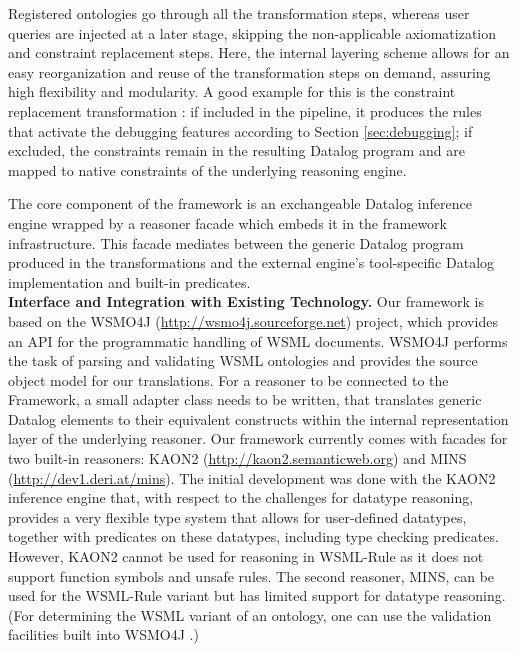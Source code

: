 Registered ontologies go through all the transformation steps,
whereas user queries are injected at a later stage, skipping the
non-applicable axiomatization and constraint replacement steps.
Here, the internal layering scheme allows for an easy
reorganization and reuse of the transformation steps on demand,
assuring high flexibility and modularity. A good example for this
is the constraint replacement transformation \transdebug: if
included in the pipeline, it produces the rules that activate the
debugging features according to Section \ref{sec:debugging}; if
excluded, the constraints remain in the resulting Datalog program
and are mapped to native constraints of the underlying reasoning
engine.

The core component of the framework is an exchangeable Datalog
inference engine wrapped by a reasoner facade which embeds it in the
framework infrastructure. This facade mediates between the generic
Datalog program produced in the transformations and the external
engine's tool-specific Datalog implementation and built-in
predicates.\\[2mm]
{\bfseries Interface and Integration with Existing Technology.} Our
framework is based on the WSMO4J
({\url{http://wsmo4j.sourceforge.net}}) project, which provides an
API for the programmatic handling of WSML documents. WSMO4J performs
the task of parsing and validating WSML ontologies and provides the
source object model for our translations. For a reasoner to be
connected to the Framework, a small adapter class needs to be
written, that translates generic Datalog elements to their
equivalent constructs within the internal representation layer of
the underlying reasoner. Our framework currently comes with facades
for two built-in reasoners: KAON2
({\url{http://kaon2.semanticweb.org}}) and MINS
({\url{http://dev1.deri.at/mins}}). The initial development was done
with the KAON2 inference engine that, with respect to the challenges
for datatype reasoning, provides a very flexible type system that
allows for user-defined datatypes, together with predicates on these
datatypes, including type checking predicates. However, KAON2 cannot
be used for reasoning in WSML-Rule as it does not support function
symbols and unsafe rules. The second reasoner, MINS, can be used for
the WSML-Rule variant but has limited support for datatype
reasoning. (For determining the WSML variant of an ontology, one can
use the validation facilities built into WSMO4J
.)
